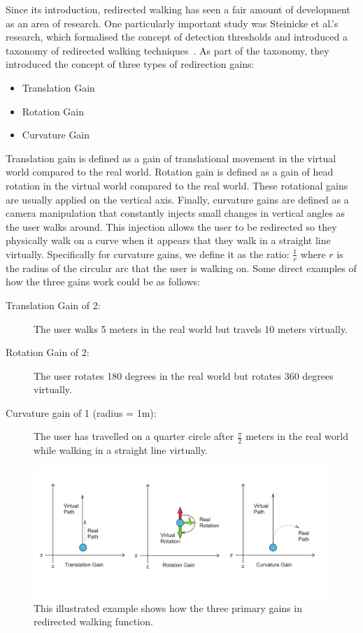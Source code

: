 Since its introduction, redirected walking has seen a fair amount of development as an area of research. One particularly important study was Steinicke et al.'s research, which formalised the concept of detection thresholds and introduced a taxonomy of redirected walking techniques~\cite{5072212}. As part of the taxonomy, they introduced the concept of three types of redirection gains:
\begin{itemize}
    \item Translation Gain
    \item Rotation Gain
    \item Curvature Gain
\end{itemize}

Translation gain is defined as a gain of translational movement in the virtual world compared to the real world. Rotation gain is defined as a gain of head rotation in the virtual world compared to the real world. These rotational gains are usually applied on the vertical axis. Finally, curvature gains are defined as a camera manipulation that constantly injects small changes in vertical angles as the user walks around. This injection allows the user to be redirected so they physically walk on a curve when it appears that they walk in a straight line virtually. Specifically for curvature gains, we define it as the ratio: $\frac{1}{r}$ where $r$ is the radius of the circular arc that the user is walking on. Some direct examples of how the three gains work could be as follows:
\begin{description}
    \item[Translation Gain of 2:] The user walks 5 meters in the real world but travels 10 meters virtually.
    \item[Rotation Gain of 2:] The user rotates 180 degrees in the real world but rotates 360 degrees virtually.
    \item[Curvature gain of 1 (radius = 1m):] The user has travelled on a quarter circle after $\frac{\pi}{2}$ meters in the real world while walking in a straight line virtually.
\end{description}

\begin{figure}[tbph]
    \centering
    \includegraphics[width=1.0\textwidth]{figures/graphs/redirectionGains.png}
    \caption[Illustrated Example of How Redirection Gains Function]{This illustrated example shows how the three primary gains in redirected walking function.}
    \label{fig:redirectionGainsExample}
\end{figure}

